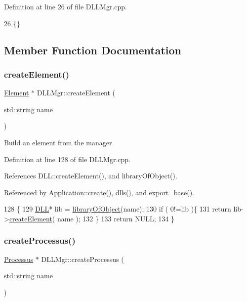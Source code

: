 Definition at line 26 of file D\+L\+L\+Mgr.\+cpp.


\begin{DoxyCode}
26 \{\} 
\end{DoxyCode}


\subsection{Member Function Documentation}
\mbox{\label{classDLLMgr_a8cc61eaf98a6aa3cb99fee7226477053}} 
\subsubsection{\texorpdfstring{create\+Element()}{createElement()}}
{\footnotesize\ttfamily \hyperlink{classElement}{Element} $\ast$ D\+L\+L\+Mgr\+::create\+Element (\begin{DoxyParamCaption}\item[{std\+::string}]{name }\end{DoxyParamCaption})}

Build an element from the manager 

Definition at line 128 of file D\+L\+L\+Mgr.\+cpp.



References D\+L\+L\+::create\+Element(), and library\+Of\+Object().



Referenced by Application\+::create(), dlls(), and export\+\_\+base().


\begin{DoxyCode}
128                                                 \{
129   \hyperlink{classDLL}{DLL}* lib = \hyperlink{classDLLMgr_a7e8c992899b7357158aef047a2f15c51}{libraryOfObject}(name);
130   \textcolor{keywordflow}{if} ( 0!=lib )\{
131     \textcolor{keywordflow}{return} lib->\hyperlink{classDLL_a20cd236b93830729cad8fcec092e5e18}{createElement}( name );
132   \}
133   \textcolor{keywordflow}{return} NULL;
134 \}
\end{DoxyCode}
\mbox{\label{classDLLMgr_a04161fedb24bb6ae8469848d97804c39}} 
\subsubsection{\texorpdfstring{create\+Processus()}{createProcessus()}}
{\footnotesize\ttfamily \hyperlink{classProcessus}{Processus} $\ast$ D\+L\+L\+Mgr\+::create\+Processus (\begin{DoxyParamCaption}\item[{std\+::string}]{name }\end{DoxyParamCaption})}

